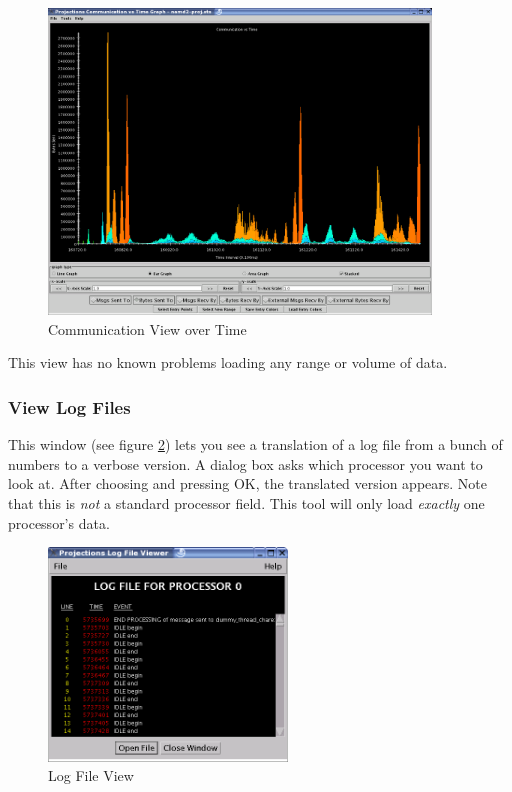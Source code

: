 \documentclass[10pt]{article}
\begin{document}
\begin{figure}[htb]
\center
\includegraphics[width=4.0in]{fig/apoa1_512_CommTimeProfile}
\caption{Communication View over Time}
\label{communication-time}
\end{figure}

This view has no known problems loading any range or volume of data.

\subsubsection{View Log Files}

This window (see figure \ref{viewlog}) lets you see a translation of a
log file from a bunch of numbers to a verbose version.  A dialog box
asks which processor you want to look at.  After choosing and pressing
OK, the translated version appears. Note that this is {\it not} a
standard processor field. This tool will only load {\it exactly} one
processor's data.

\begin{figure}[htb]
\center
\includegraphics[width=2.5in]{fig/viewlog}
\caption{Log File View}
\label{viewlog}
\end{figure}
\end{document}
